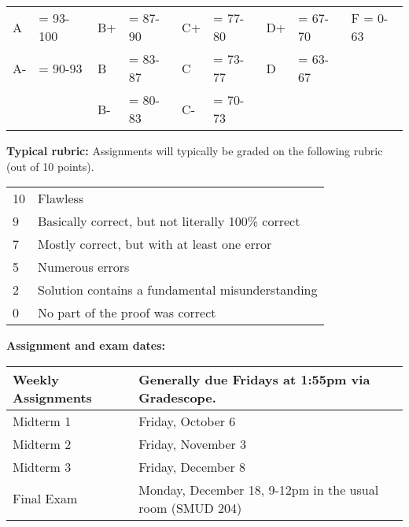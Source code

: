 \documentclass[12pt]{article}
\begin{document}
\begin{center}
 \begin{tabular}{|ll|ll|ll|ll|l|}
\hline
A &\hspace{-3 pt}\hspace{-7 pt}= 93-100 &B+ &\hspace{-7 pt}= 87-90 &C+ &\hspace{-7 pt}= 77-80 & D+ &\hspace{-7 pt}= 67-70 & F = 0-63\\
A- &\hspace{-3 pt}\hspace{-7 pt}= 90-93 &B &\hspace{-7 pt}= 83-87 & C &\hspace{-7 pt}= 73-77 & D &\hspace{-7 pt}= 63-67 &\\
 & &B- &\hspace{-7 pt}= 80-83 &C- &\hspace{-7 pt}= 70-73 & & &\\
 \hline
 \end{tabular}
\end{center}

\newpage
\vspace*{.15in}
\noindent\textbf{Typical rubric:}
Assignments will typically be graded on the following rubric (out of 10 points).

\begin{center}
 \begin{tabular}{|l|l|}
 \hline
 10& Flawless\\
 9& Basically correct, but not literally 100\% correct\\
 7& Mostly correct, but with at least one error\\
 5& Numerous errors\\
 2& Solution contains a fundamental misunderstanding\\
 0& No part of the proof was correct\\
 \hline
 \end{tabular}
\end{center}

\noindent\textbf{Assignment and exam dates:}

\begin{center}
 \begin{tabular}{|l|l|}
 \hline
 Weekly Assignments & Generally due Fridays at 1:55pm via Gradescope.\\
 \hline
 Midterm 1 & Friday, October 6 \\
 Midterm 2 & Friday, November 3 \\
   Midterm 3 & Friday, December 8 \\
   Final Exam & Monday, December 18, 9-12pm in the usual room (SMUD 204)	 \\
 \hline
 \end{tabular}
\end{center}
\end{document}
